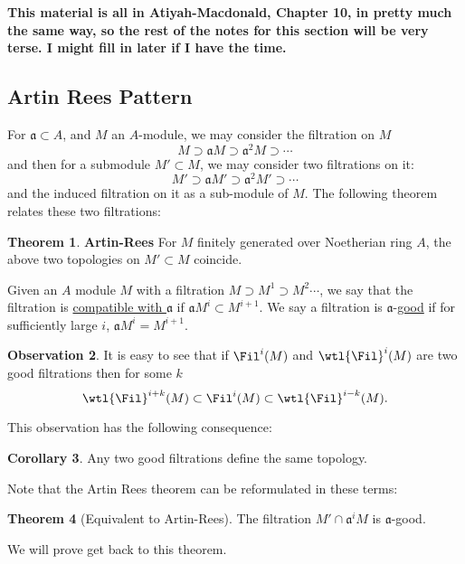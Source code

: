 \documentclass[12 pt]{article}
\theoremstyle{definition}
\newtheorem{theorem}{Theorem}[section]
\newtheorem{corollary}[theorem]{Corollary}
\newtheorem{obs}[theorem]{Observation}
\newcommand\fa{{\mathfrak a}}
\begin{document}
\textbf{This material is all in Atiyah-Macdonald, Chapter 10, in pretty much the same way, so the rest of the notes for this section will be very terse. I might fill in later if I have the time.}






\subsection{Artin Rees Pattern}

For $\fa \subset A$, and $M$ an $A$-module, we may consider the filtration on $M$
\[M \supset \fa M \supset \fa^2 M \supset \cdots\]
and then for a submodule $M' \subset M$, we may consider two filtrations on it:
\[M' \supset \fa M' \supset \fa^2 M' \supset \cdots\]
and the induced filtration on it as a sub-module of $M$. The following theorem relates these two filtrations:
\begin{theorem} \textbf{Artin-Rees} For $M$ finitely generated over Noetherian ring $A$, the above two topologies on $M' \subset M$ coincide.
\end{theorem}

\begin{definition} Given an $A$ module $M$ with a filtration $M \supset M^1 \supset M^2 \cdots$, we say that the filtration is \underline{compatible with $\fa$} if $\fa M^i \subset M^{i+1}$. We say a filtration is $\fa$-\underline{good} if for sufficiently large $i$, $\fa M^i=M^{i+1}$.
\end{definition}

\begin{obs} It is easy to see that if $\Fil^i(M)$ and $\wtl{\Fil}^i(M)$ are two good filtrations then for some $k$
\[\wtl{\Fil}^{i+k}(M) \subset \Fil^i(M) \subset \wtl{\Fil}^{i-k}(M).\]
\end{obs}



This observation has the following consequence:
\begin{corollary} Any two good filtrations define the same topology.
\end{corollary}

Note that the Artin Rees theorem can be reformulated in these terms:

\begin{theorem} [Equivalent to Artin-Rees] The filtration $M' \cap \fa^i M$ is $\fa$-good.
\end{theorem}

We will prove get back to this theorem.
\end{document}
